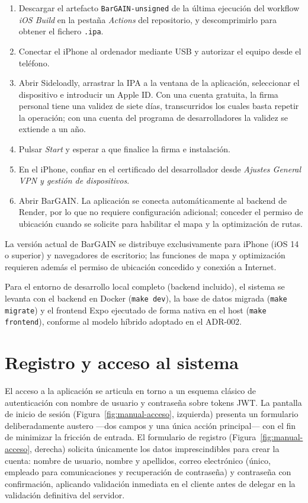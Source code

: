 \begin{enumerate}
  \item Descargar el artefacto \texttt{BarGAIN-unsigned} de la \'ultima ejecuci\'on del
    workflow \emph{iOS Build} en la pesta\~na \emph{Actions} del repositorio, y descomprimirlo
    para obtener el fichero \texttt{.ipa}.
  \item Conectar el iPhone al ordenador mediante USB y autorizar el equipo desde el tel\'efono.
  \item Abrir Sideloadly, arrastrar la IPA a la ventana de la aplicaci\'on, seleccionar el
    dispositivo e introducir un Apple ID. Con una cuenta gratuita, la firma personal tiene una
    validez de siete d\'ias, transcurridos los cuales basta repetir la operaci\'on; con una
    cuenta del programa de desarrolladores la validez se extiende a un a\~no.
  \item Pulsar \emph{Start} y esperar a que finalice la firma e instalaci\'on.
  \item En el iPhone, confiar en el certificado del desarrollador desde \emph{Ajustes
    \textrightarrow{} General \textrightarrow{} VPN y gesti\'on de dispositivos}.
  \item Abrir BarGAIN. La aplicaci\'on se conecta autom\'aticamente al backend de Render, por
    lo que no requiere configuraci\'on adicional; conceder el permiso de ubicaci\'on cuando se
    solicite para habilitar el mapa y la optimizaci\'on de rutas.
\end{enumerate}

La versi\'on actual de BarGAIN se distribuye exclusivamente para iPhone (iOS 14 o superior) y
navegadores de escritorio; las funciones de mapa y optimizaci\'on requieren adem\'as el permiso
de ubicaci\'on concedido y conexi\'on a Internet.

Para el entorno de desarrollo local completo (backend incluido), el sistema se levanta con el
backend en Docker (\texttt{make dev}), la base de datos migrada (\texttt{make migrate})
y el frontend Expo ejecutado de forma nativa en el host (\texttt{make frontend}), conforme al
modelo h\'ibrido adoptado en el ADR-002.

\section{Registro y acceso al sistema}\label{sec:manual-acceso}

El acceso a la aplicaci\'on se articula en torno a un esquema cl\'asico de autenticaci\'on con
nombre de usuario y contrase\~na sobre tokens JWT. La pantalla de inicio de sesi\'on
(Figura~\ref{fig:manual-acceso}, izquierda) presenta un formulario deliberadamente austero
---dos campos y una \'unica acci\'on principal--- con el fin de minimizar la fricci\'on de
entrada. El formulario de registro (Figura~\ref{fig:manual-acceso}, derecha) solicita
\'unicamente los datos imprescindibles para crear la cuenta: nombre de usuario, nombre y
apellidos, correo electr\'onico (\'unico, empleado para comunicaciones y recuperaci\'on de
contrase\~na) y contrase\~na con confirmaci\'on, aplicando validaci\'on inmediata en el cliente
antes de delegar en la validaci\'on definitiva del servidor.

